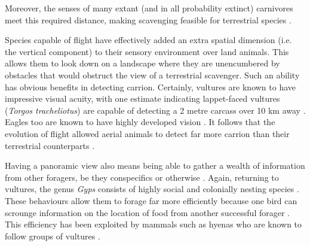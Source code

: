 \documentclass[a4paper,12pt]{article}
\begin{document}

Moreover, the senses of many extant (and in all probability extinct) carnivores meet this required distance, making scavenging feasible for terrestrial species \citep{farlow1994speculations,mech2010wolves}. 

Species capable of flight have effectively added an extra spatial dimension (i.e. the vertical component) to their sensory environment over land animals.
This allows them to look down on a landscape where they are unencumbered by obstacles that would obstruct the view of a terrestrial scavenger.
Such an ability has obvious benefits in detecting carrion.
Certainly, vultures are known to have impressive visual acuity, with one estimate indicating lappet-faced vultures %
 (\textit{Torgos tracheliotus}) are capable of detecting a 2 metre carcass over 10 km away \citep{spiegel2013factors}.
Eagles too are known to have highly developed vision \citep{reymond1985spatial}.
It follows that the evolution of flight allowed aerial animals to detect far more carrion than their terrestrial counterparts \citep{AR:AR22815}.



Having a panoramic view also means being able to gather a wealth of information from other foragers, be they conspecifics or otherwise \citep{jackson2008effect}.
Again, returning to vultures, the genus \textit{Gyps} consists of highly social and colonially nesting species \citep{fernandez2015density}.
These behaviours allow them to forage far more efficiently because one bird can scrounge information on the location of food from another successful forager \citep{KaneVul}.
This efficiency has been exploited by mammals such as hyenas who are known to follow groups of vultures \citep{jones2015african}. 
\end{document}
